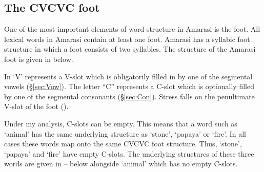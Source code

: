 \subsection{The CVCVC foot}\label{sec:TheFoo}
One of the most important elements of word structure in Amarasi is the foot.
All lexical words in Amarasi contain at least one foot.
Amarasi has a syllabic foot structure in which a foot consists of two syllables.
The structure of the Amarasi foot is given in  below.

\begin{exe}
	\label{ex:Ft.->CVCVC}
\end{exe}

In  `V' represents a V-slot
which is obligatorily filled in by one of the segmental vowels ({\S}\ref{sec:Vow}).
The letter ``C'' represents a C-slot which is optionally
filled by one of the segmental consonants ({\S}\ref{sec:Con}).
Stress falls on the penultimate V-slot of the foot ().

Under my analysis, C-slots can be empty.
This means that a word such as  `animal'
has the same underlying structure as  `stone',  `papaya' or  `fire'.
In all cases these words map onto the same CVCVC foot structure.
Thus,  `stone',  `papaya'  and  `fire' have empty C-slots.
The underlying structures of these three words
are given in -- below
alongside  `animal' which has no empty C-slots.

